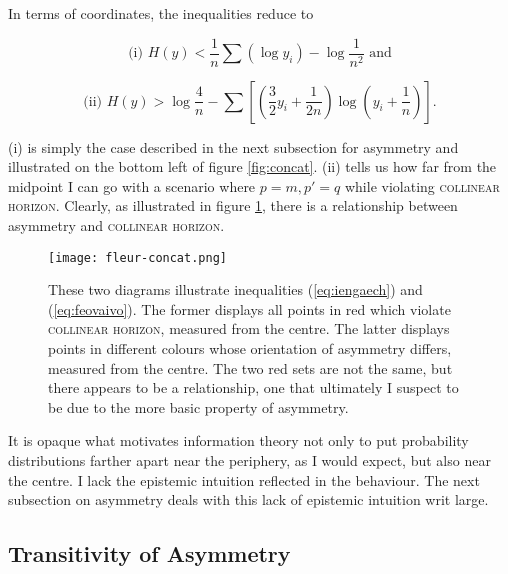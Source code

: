 \documentclass[11pt]{article}
\begin{document}
In terms of coordinates, the inequalities reduce to

\begin{equation}
  \label{eq:iengaech}
\mbox{(i) }H(y)<\frac{1}{n}\sum\left(\log{}y_{i}\right)-\log\frac{1}{n^{2}}\mbox{ and}
\end{equation}

\begin{equation}
  \label{eq:feovaivo}
\mbox{(ii) }H(y)>\log\frac{4}{n}-\sum\left[\left(\frac{3}{2}y_{i}+\frac{1}{2n}\right)\log\left(y_{i}+\frac{1}{n}\right)\right].
\end{equation}

(i) is simply the case described in the next subsection for asymmetry
and illustrated on the bottom left of figure \ref{fig:concat}. (ii)
tells us how far from the midpoint I can go with a scenario where
$p=m,p'=q$ while violating \textsc{collinear horizon}. Clearly, as
illustrated in figure \ref{fig:eeghoomo}, there is a relationship
between asymmetry and \textsc{collinear horizon}. 

\begin{figure}[ht]
  \begin{flushright}
    \begin{minipage}[h]{\linewidth}
      \texttt{[image: fleur-concat.png]}
      \caption{\footnotesize These two diagrams illustrate
        inequalities (\ref{eq:iengaech}) and (\ref{eq:feovaivo}). The
        former displays all points in red which violate
        \textsc{collinear horizon}, measured from the centre. The
        latter displays points in different colours whose orientation
        of asymmetry differs, measured from the centre. The two red
        sets are not the same, but there appears to be a relationship,
        one that ultimately I suspect to be due to the more basic
        property of asymmetry.}
      \label{fig:eeghoomo}
    \end{minipage}
  \end{flushright}
\end{figure}

It is opaque what motivates information theory not only to put
probability distributions farther apart near the periphery, as I would
expect, but also near the centre. I lack the epistemic intuition
reflected in the behaviour. The next subsection on asymmetry deals
with this lack of epistemic intuition writ large.

\subsection{Transitivity of Asymmetry}
\label{subsec:Asymmetry}
\end{document}

